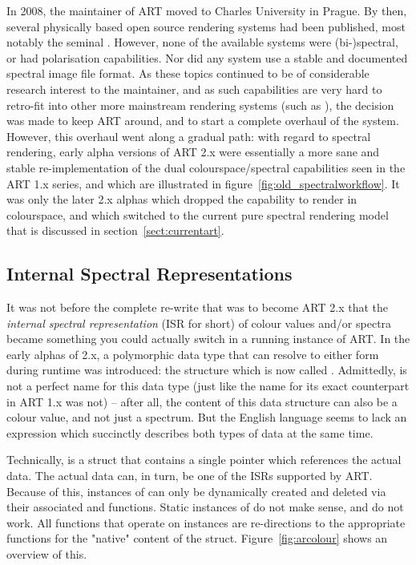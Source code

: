 In 2008, the maintainer of ART moved to Charles University in Prague. By then, several physically based open source rendering systems had been published, most notably the seminal . However, none of the available systems were (bi-)spectral, or had polarisation capabilities. Nor did any system use a stable and documented spectral image file format. As these topics continued to be of considerable research interest to the maintainer, and as such capabilities are very hard to retro-fit into other more mainstream rendering systems (such as ), the decision was made to keep ART around, and to start a complete overhaul of the system. However, this overhaul went along a gradual path: with regard to spectral rendering, early alpha versions of ART 2.x were essentially a more sane and stable re-implementation of the dual colourspace/spectral capabilities seen in the ART 1.x series, and which are illustrated in figure~\ref{fig:old_spectralworkflow}. It was only the later 2.x alphas which dropped the capability to render in colourspace, and which switched to the current pure spectral rendering model that is discussed in section~\ref{sect:currentart}.

\subsection{Internal Spectral Representations}
\label{sect:CCTs}
It was not before the complete re-write that was to become ART 2.x that the \emph{internal spectral representation} (ISR for short) of colour values and/or spectra became something you could actually switch in a running instance of ART. In the early alphas of 2.x, a polymorphic data type that can resolve to either form during runtime was introduced: the structure which is now called . Admittedly,  is not a perfect name for this data type (just like the name for its exact counterpart  in ART 1.x was not) -- after all, the content of this data structure can also be a colour value, and not just a spectrum. But the English language seems to lack an expression which succinctly describes both types of data at the same time.

Technically,  is a struct that contains a single  pointer which references the actual data. The actual data can, in turn, be one of the ISRs supported by ART. Because of this, instances of  can only be dynamically created and deleted via their associated  and  functions. Static instances of  do not make sense, and do not work. All functions that operate on  instances are re-directions to the appropriate functions for the "native" content of the  struct. Figure~\ref{fig:arcolour} shows an overview of this.

